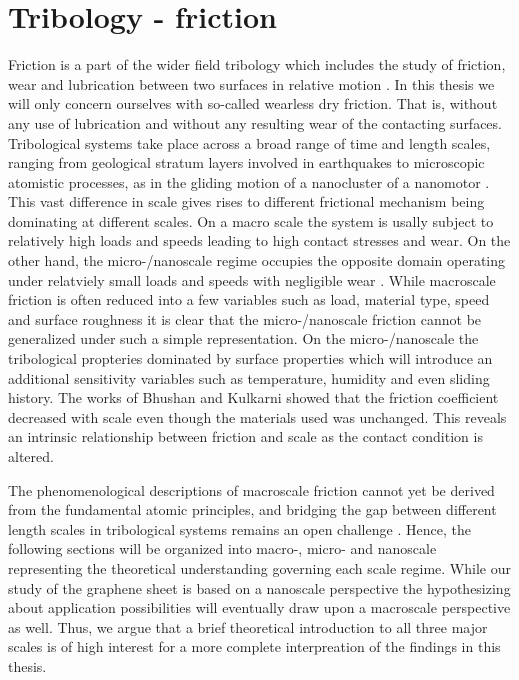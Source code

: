\section{Tribology - friction}
Friction is a part of the wider field tribology which includes the study of
friction, wear and lubrication between two surfaces in relative motion \cite[p.
1]{gnecco_meyer_2015}. In this thesis we will only concern ourselves with so-called wearless dry friction. That is, without any use of lubrication and without any resulting wear of the contacting surfaces. Tribological systems take place across a broad
range of time and length scales, ranging from geological stratum layers involved
in earthquakes \cite{kim_nano-scale_2009} to microscopic atomistic processes, as
in the gliding motion of a nanocluster of a nanomotor \cite{Manini_2016}. This
vast difference in scale gives rises to different frictional mechanism being
dominating at different scales. On a macro scale the system is usally subject
to relatively high loads and speeds leading to high contact stresses and
wear. On the other hand, the micro-/nanoscale regime occupies the opposite domain operating under relatviely small loads and speeds with negligible wear \cite{kim_nano-scale_2009} \cite[p. 5]{bhushan_2013}. While macroscale friction is often reduced into a few variables such as load, material type, speed and surface roughness it is clear that the micro-/nanoscale friction cannot be generalized under such a simple representation. On the micro-/nanoscale the tribological propteries dominated by surface properties which will introduce an additional sensitivity variables such as temperature, humidity and even sliding history. The works of Bhushan and Kulkarni \cite[(1996)]{BHUSHAN199649} showed that the friction coefficient decreased with scale even though the materials used was unchanged. This reveals an intrinsic relationship between friction and scale as the contact condition is altered.

The phenomenological descriptions of macroscale friction cannot yet be derived from the fundamental atomic principles, and bridging the gap between different length scales in tribological systems remains an open challenge \cite{Manini_2016}. Hence, the following sections will be organized into macro-, micro- and nanoscale representing the theoretical understanding governing each scale regime. While our study of the graphene sheet is based on a nanoscale perspective the hypothesizing about application possibilities will eventually draw upon a macroscale perspective as well. Thus, we argue that a brief theoretical introduction to all three major scales is of high interest for a more complete interpreation of the findings in this thesis. 


